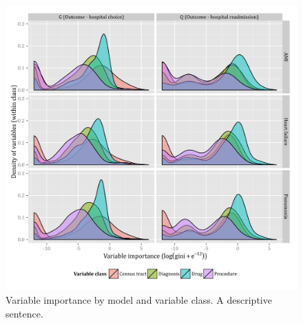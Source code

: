 \documentclass[]{article}\usepackage[]{graphicx}\usepackage[]{color}
\begin{document}
\begin{figure}[H]
    \includegraphics{../figures/variable_importance_by_model_and_class.png}
    \caption[Error rate for random forest model of hospital choice.]
      {Variable importance by model and variable class. A descriptive sentence.}
    \label{fig:variable_importance_by_model_and_class}
\end{figure}
\end{document}
